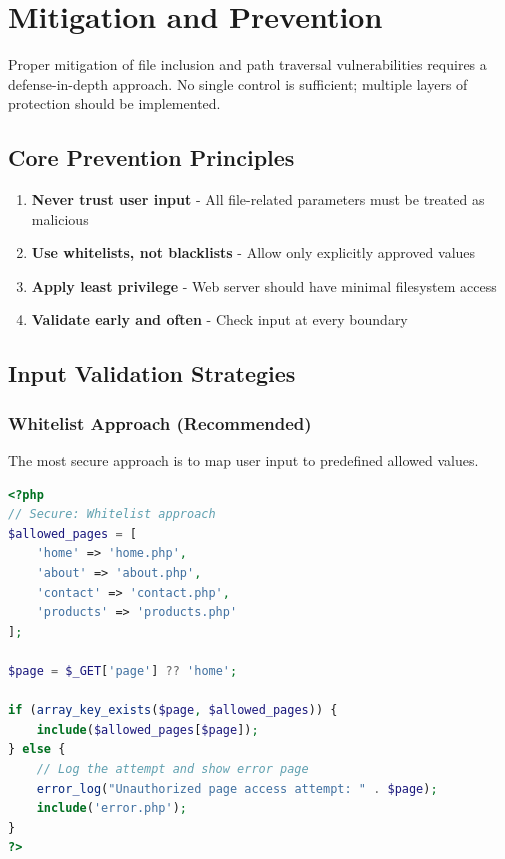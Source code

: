 \documentclass[12pt]{article}
\begin{document}


\section{Mitigation and Prevention}

Proper mitigation of file inclusion and path traversal vulnerabilities requires a defense-in-depth approach. No single control is sufficient; multiple layers of protection should be implemented.

\subsection{Core Prevention Principles}

\begin{infobox}
\begin{enumerate}
    \item \textbf{Never trust user input} - All file-related parameters must be treated as malicious
    \item \textbf{Use whitelists, not blacklists} - Allow only explicitly approved values
    \item \textbf{Apply least privilege} - Web server should have minimal filesystem access
    \item \textbf{Validate early and often} - Check input at every boundary
\end{enumerate}
\end{infobox}

\subsection{Input Validation Strategies}

\subsubsection{Whitelist Approach (Recommended)}

The most secure approach is to map user input to predefined allowed values.

\begin{lstlisting}[language=PHP, caption=Whitelist Implementation]
<?php
// Secure: Whitelist approach
$allowed_pages = [
    'home' => 'home.php',
    'about' => 'about.php',
    'contact' => 'contact.php',
    'products' => 'products.php'
];

$page = $_GET['page'] ?? 'home';

if (array_key_exists($page, $allowed_pages)) {
    include($allowed_pages[$page]);
} else {
    // Log the attempt and show error page
    error_log("Unauthorized page access attempt: " . $page);
    include('error.php');
}
?>
\end{lstlisting}
\end{document}
